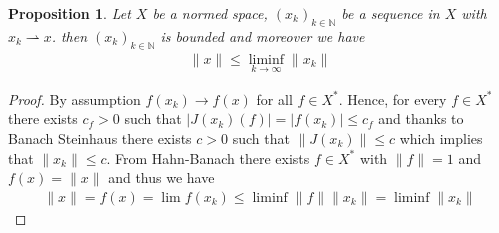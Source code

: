 \documentclass[11pt,a4paper]{article}
\newtheorem{prop}{Proposition}[section]
\theoremstyle{definition}
\newcommand{\wto}{\rightharpoonup}
\begin{document}
\begin{prop} Let $X$ be a normed space, $(x_k)_{k \in \mathbb{N}}$ be a sequence in $X$ with $x_k \wto x$. then $(x_k)_{k \in \mathbb{N}}$ is bounded and moreover we have 
\begin{align*}
\| x \| \leq \liminf_{k \to \infty} \|x_k\|
\end{align*}
\end{prop}
\begin{proof}
By assumption $f(x_k) \to f(x)$ for all $f \in X^*$. Hence, for every $f \in X^*$ there exists $c_f >0$ such that  $|J(x_k)(f)| = |f(x_k)| \leq c_f$ and thanks to Banach Steinhaus there exists $c>0$ such that $\|J(x_k)\| \leq c$ which implies that $\|x_k\| \leq c$. From Hahn-Banach there exists $f \in X^*$ with $\|f\|=1$ and $f(x)=\|x\|$ and thus we have 
\begin{align*}
\|x\| = f(x) = \lim f(x_k) \leq \liminf\| f\| \|x_k\| = \liminf \|x_k\|
\end{align*}
\end{proof}
\newpage
\end{document}
